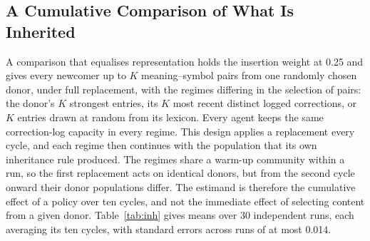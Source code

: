\documentclass[11pt]{article}
\begin{document}
\subsection{A Cumulative Comparison of What Is Inherited}

A comparison that equalises representation holds the insertion weight at 0.25 and gives every newcomer up to $K$ meaning--symbol pairs from one randomly chosen donor, under full replacement, with the regimes differing in the selection of pairs: the donor's $K$ strongest entries, its $K$ most recent distinct logged corrections, or $K$ entries drawn at random from its lexicon. Every agent keeps the same correction-log capacity in every regime. This design applies a replacement every cycle, and each regime then continues with the population that its own inheritance rule produced. The regimes share a warm-up community within a run, so the first replacement acts on identical donors, but from the second cycle onward their donor populations differ. The estimand is therefore the cumulative effect of a policy over ten cycles, and not the immediate effect of selecting content from a given donor. Table~\ref{tab:inh} gives means over 30 independent runs, each averaging its ten cycles, with standard errors across runs of at most 0.014.

\begin{table}[ht]
\centering
\caption{Cumulative design, full replacement, 30 independent runs. Each rule shapes its own donor population. Agreement is the share of inherited pairs matching the consensus before replacement. Retention is measured immediately, after 100 and after 400 interactions. The no-inheritance baseline has retention 0.09 after 400 interactions and last-100 success 0.33.}
\label{tab:inh}
\end{table}
\end{document}
